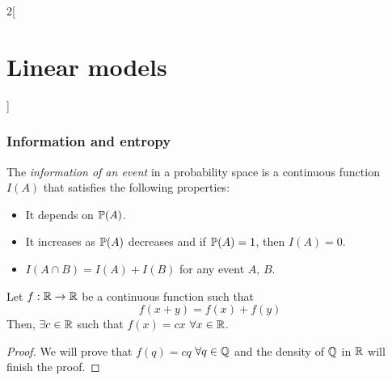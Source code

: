 \documentclass[../../../main_math.tex]{subfiles}
\begin{document}
\begin{multicols}{2}[\section{Linear models}]
  \subsubsection{Information and entropy}
  \begin{axiom}[Information]\label{LM:info}
    The \emph{information of an event} in a probability space is a continuous function $I(A)$ that satisfies the following properties:
    \begin{itemize}
      \item It depends on $\mathbb{P}(A)$.
      \item It increases as $\mathbb{P}(A)$ decreases and if $\mathbb{P}(A)=1$, then $I(A)=0$.
      \item $I(A\cap B)= I(A) + I(B)$ for any event $A$, $B$.
    \end{itemize}
  \end{axiom}
  \begin{theorem}\label{LM:cauchy_functional}
    Let $f:\mathbb{R}\rightarrow\mathbb{R}$ be a continuous function such that $$f(x+y) = f(x)+f(y)$$
    Then, $\exists c\in\mathbb{R}$ such that $f(x)=cx$ $\forall x\in\mathbb{R}$.
  \end{theorem}
  \begin{proof}
    We will prove that $f(q)=cq$ $\forall q\in\mathbb{Q}$ and the density of $\mathbb{Q}$ in $\mathbb{R}$ will finish the proof.


\end{proof}
\end{multicols}
\end{document}
